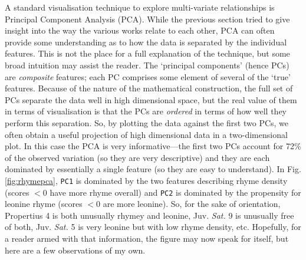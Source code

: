 \documentclass[twocolumn, switch, a4paper]{article} %
\begin{document}
A standard visualisation technique to explore multi-variate relationships is
Principal Component Analysis (PCA). While the previous section tried to give
insight into the way the various works relate to each other, PCA can often
provide some understanding as to how the data is separated by the individual
features. This is not the place for a full explanation of the technique, but
some broad intuition may assist the reader. The `principal components' (hence
PCs) are \emph{composite} features; each PC comprises some element of several
of the `true' features. Because of the nature of the mathematical
construction, the full set of PCs separate the data well in high dimensional
space, but the real value of them in terms of visualisation is that the PCs
are \emph{ordered} in terms of how well they perform this separation. So, by
plotting the data against the first two PCs, we often obtain a useful
projection of high dimensional data in a two-dimensional plot. In this case
the PCA is very informative---the first two PCs account for 72\% of the
observed variation (so they are very descriptive) and they are each dominated
by essentially a single feature (so they are easy to understand). In Fig.
\ref{fig:rhymepca}, \texttt{PC1} is dominated by the two features describing
rhyme density (scores $<0$ have more rhyme overall) and \texttt{PC2} is
dominated by the propensity for leonine rhyme (scores $<0$ are more leonine).
So, for the sake of orientation, Propertius 4 is both unusually rhymey and
leonine, Juv. \emph{Sat.} 9 is unusually free of both, Juv. \emph{Sat.} 5 is
very leonine but with low rhyme density, etc. Hopefully, for a reader armed
with that information, the figure may now speak for itself, but here are a few
observations of my own.
\end{document}
